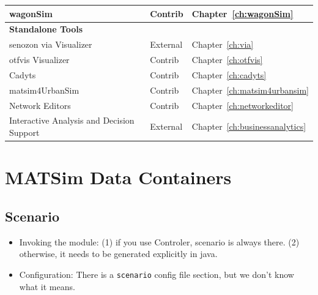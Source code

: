 \begin{center}
\begin{longtable}{|l|l|l|}
	wagonSim & Contrib & Chapter~\ref{ch:wagonSim} \\
	\hline
	\textbf{Standalone Tools} & &\\ %
	\hline
	\gls{senozon} \gls{via} Visualizer & External & Chapter~\ref{ch:via} \\
	\gls{otfvis} Visualizer & Contrib & Chapter~\ref{ch:otfvis} \\
	Cadyts & Contrib & Chapter~\ref{ch:cadyts} \\
	\gls{matsim}4UrbanSim & Contrib & Chapter~\ref{ch:matsim4urbansim} \\	
	Network Editors & Contrib &  Chapter~\ref{ch:networkeditor} \\
	Interactive Analysis and Decision Support & External & Chapter~\ref{ch:businessanalytics} \\
\end{longtable}
\end{center}

\section{MATSim Data Containers}
\label{sec:extending-data-containers}
\subsection{Scenario}
\label{sec:extending-scenario}

\begin{itemize}\styleItemize
\item Invoking the module: (1) if you use Controler, scenario is always there. (2) otherwise, it needs to be generated explicitly in java.  

\item Configuration: There is a \lstinline|scenario| config file section, but we don't know what it means.  
\end{itemize}

